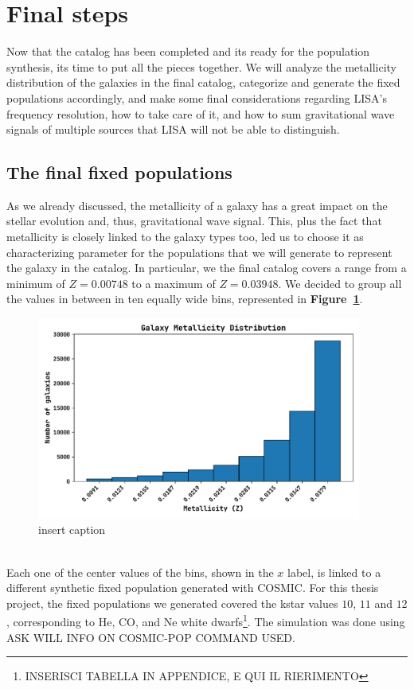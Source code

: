 \section{Final steps}
Now that the catalog has been completed and its ready for the population synthesis, its time to put all the pieces together.
We will analyze the metallicity distribution of the galaxies in the final catalog, categorize and generate the fixed populations accordingly, and make some final considerations regarding LISA's frequency resolution, how to take care of it, and how to sum gravitational wave signals of multiple sources that LISA will not be able to distinguish. 

\subsection{The final fixed populations}
As we already discussed, the metallicity of a galaxy has a great impact on the stellar evolution and, thus, gravitational wave signal.
This, plus the fact that metallicity is closely linked to the galaxy types too, led us to choose it as characterizing parameter for the populations that we will generate to represent the galaxy in the catalog.
In particular, we the final catalog covers a range from a minimum of $ Z= 0.00748$ to a maximum of $Z= 0.03948$.
We decided to group all the values in between in ten equally wide bins, represented in \textbf{Figure~\ref{fig: Z distribution of final catalog}}.
\begin{figure}[h!]
    \begin{center}
        \includegraphics[width=0.95\textwidth]{images/z_distro_gwgc_completed_ZOA.pdf}
    \end{center}
    \caption{insert caption}\label{fig: Z distribution of final catalog}
\end{figure}\\
Each one of the center values of the bins, shown in the $x$ label, is linked to a different synthetic fixed population generated with COSMIC.
For this thesis project, the fixed populations we generated covered the kstar values $10$, $11$ and $12$, corresponding to He, CO, and Ne white dwarfs\footnote{INSERISCI TABELLA IN APPENDICE, E QUI IL RIERIMENTO}.
The simulation was done using ASK WILL INFO ON COSMIC-POP COMMAND USED.

